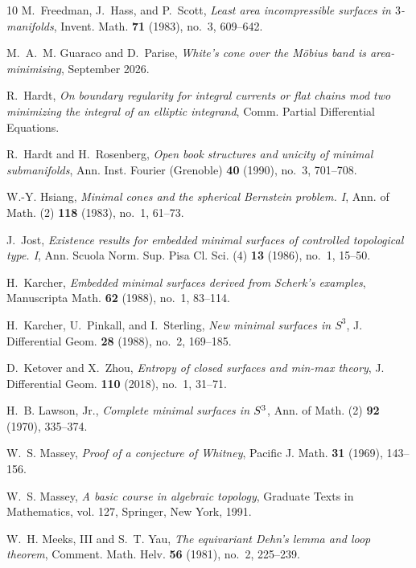 \documentclass[11pt, reqno]{amsart}
\numberwithin{equation}{section}
\begin{document}
\begin{thebibliography}{10}
	M.~Freedman, J.~Hass, and P.~Scott, \emph{Least area incompressible surfaces in
		{$3$}-manifolds}, Invent. Math. \textbf{71} (1983), no.~3, 609--642.
	
	M.~A.~M. Guaraco and D.~Parise, \emph{White's cone over the {{M\"obius}} band
		is area-minimising}, September 2026.
	
	R.~Hardt, \emph{On boundary regularity for integral currents or flat chains mod
		two minimizing the integral of an elliptic integrand}, Comm. Partial
	Differential Equations.
	
	R.~Hardt and H.~Rosenberg, \emph{Open book structures and unicity of minimal
		submanifolds}, Ann. Inst. Fourier (Grenoble) \textbf{40} (1990), no.~3,
	701--708.
	
	W.-Y. Hsiang, \emph{Minimal cones and the spherical {B}ernstein problem. {I}},
	Ann. of Math. (2) \textbf{118} (1983), no.~1, 61--73.
	
	J.~Jost, \emph{Existence results for embedded minimal surfaces of controlled
		topological type. {I}}, Ann. Scuola Norm. Sup. Pisa Cl. Sci. (4) \textbf{13}
	(1986), no.~1, 15--50.
	
	H.~Karcher, \emph{Embedded minimal surfaces derived from {S}cherk's examples},
	Manuscripta Math. \textbf{62} (1988), no.~1, 83--114.
	
	H.~Karcher, U.~Pinkall, and I.~Sterling, \emph{New minimal surfaces in
		{$S^3$}}, J. Differential Geom. \textbf{28} (1988), no.~2, 169--185.
	
	D.~Ketover and X.~Zhou, \emph{Entropy of closed surfaces and min-max theory},
	J. Differential Geom. \textbf{110} (2018), no.~1, 31--71.
	
	H.~B. Lawson, Jr., \emph{Complete minimal surfaces in {$S\sp{3}$}}, Ann. of
	Math. (2) \textbf{92} (1970), 335--374.
	
	W.~S. Massey, \emph{Proof of a conjecture of {W}hitney}, Pacific J. Math.
	\textbf{31} (1969), 143--156.
	
	W.~S. Massey, \emph{A basic course in algebraic topology}, Graduate Texts in
	Mathematics, vol. 127, Springer, New York, 1991.
	
	W.~H. Meeks, III and S.~T. Yau, \emph{The equivariant {D}ehn's lemma and loop
		theorem}, Comment. Math. Helv. \textbf{56} (1981), no.~2, 225--239.
	

\end{thebibliography}
\end{document}
